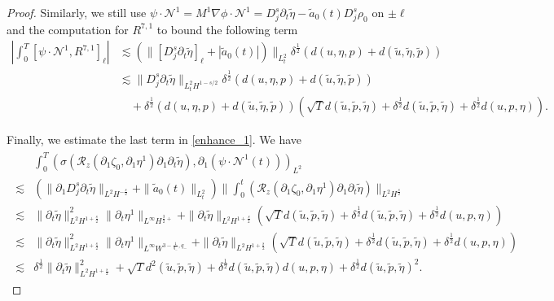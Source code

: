 \documentclass[letterpaper,reqno,10pt,twoside]{amsart}
\theoremstyle{definition}
\theoremstyle{remark}
\def\p{\partial}
\begin{document}
\begin{proof}
			Similarly, we still use $\psi\cdot\mathcal{N}^1=M^1\nabla\phi\cdot\mathcal{N}^1=D_j^s\p_t\tilde{\eta}-\tilde{a}_{0}(t)D_{j}^{s}\rho_{0}$ on $\pm\ell$ and the computation for $R^{7,1}$ to bound the following term
			\begin{equation}\label{enhance_3}
				\begin{aligned}
					|\int_0^T[\psi\cdot\mathcal{N}^1, R^{7,1}]_\ell|&\lesssim (\|[D_j^s\p_t\tilde{\eta}]_\ell+|\tilde{a}_{0}(t)|)\|_{L_{t}^{2}}\delta^{\frac{1}{2}}(d(u,\eta,p)+d(\tilde u,\tilde\eta,\tilde p))\\
					&\lesssim  \|D_j^s\p_t\tilde{\eta}\|_{L_{t}^{2}H^{1-s/2}}\delta^{\frac{1}{2}}(d(u,\eta,p)+d(\tilde u,\tilde\eta,\tilde p))\\
					&\quad+\delta^{\frac{1}{2}}(d(u,\eta,p)+d(\tilde u,\tilde\eta,\tilde p))(\sqrt{T}d(\tilde{u},\tilde{p},\tilde{\eta})+\delta^{\frac{1}{2}} d(\tilde{u},\tilde{p},\tilde{\eta})+\delta^{\frac{1}{2}} d({u},{p},{\eta})).
				\end{aligned}
			\end{equation}
			
			Finally, we estimate the last term in \eqref{enhance_1}. We have
			\begin{align}\label{enhance_5}
				\begin{aligned}
					&\int_{0}^{T}(\sigma(\mathcal{R}_{z}(\p_{1}\zeta_{0},\p_{1}\eta^{1})\p_{1}\p_{t}\tilde{\eta}),\p_{1}(\psi\cdot\mathcal{N}^{1}(t)))_{L^{2}}\\
					\lesssim& (\|\p_{1}D_{j}^{s}\p_{t}\tilde{\eta}\|_{L^{2}H^{-\frac{s}{2}}}+\|\tilde{a}_{0}(t)\|_{L_{t}^{2}})\|\int_{0}^{t}(\mathcal{R}_{z}(\p_{1}\zeta_{0},\p_{1}\eta^{1})\p_{1}\p_{t}\tilde{\eta})\|_{L^{2}H^{\frac{s}{2}}}\\
					\lesssim& \|\p_{t}\tilde{\eta}\|^{2}_{L^{2}H^{1+\frac{s}{2}}}\|\p_{t}\eta^{1}\|_{L^{\infty}H^{\frac{3}{2}+}}+\|\p_{t}\tilde{\eta}\|_{L^{2}H^{1+\frac{s}{2}}}(\sqrt{T}d(\tilde{u},\tilde{p},\tilde{\eta})+\delta^{\frac{1}{2}}d(\tilde{u},\tilde{p},\tilde{\eta})+\delta^{\frac{1}{2}} d({u},{p},{\eta}))\\\lesssim&\|\p_{t}\tilde{\eta}\|^{2}_{L^{2}H^{1+\frac{s}{2}}}\|\p_{t}\eta^{1}\|_{L^{\infty}W^{3-\frac{1}{q_{-}},q_{-}}}+\|\p_{t}\tilde{\eta}\|_{L^{2}H^{1+\frac{s}{2}}}(\sqrt{T}d(\tilde{u},\tilde{p},\tilde{\eta})+\delta^{\frac{1}{2}} d(\tilde{u},\tilde{p},\tilde{\eta})+\delta^{\frac{1}{2}} d({u},{p},{\eta}))\\
					\lesssim&\delta^{\frac{1}{2}}\|\p_{t}\tilde{\eta}\|_{L^{2}H^{1+\frac{s}{2}}}^{2}+\sqrt{T}d^{2}(\tilde{u},\tilde{p},\tilde{\eta})+\delta^{\frac{1}{2}}d(\tilde{u},\tilde{p},\tilde{\eta})d({u},{p},{\eta})+\delta^{\frac{1}{2}}d(\tilde{u},\tilde{p},\tilde{\eta})^{2}.
				\end{aligned}
			\end{align}
			

\end{proof}
\end{document}
